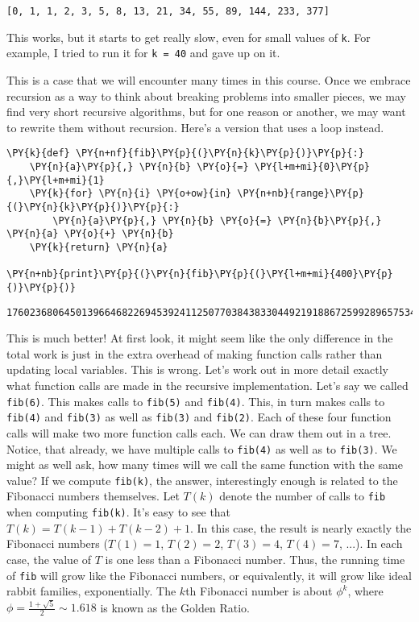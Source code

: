 \begin{Verbatim}
[0, 1, 1, 2, 3, 5, 8, 13, 21, 34, 55, 89, 144, 233, 377]

\end{Verbatim}


This works, but it starts to get really slow, even for small values of \texttt{k}.
For example, I tried to run it for \texttt{k = 40} and gave up on it.


This is a case that we will encounter many times in this course.
Once we embrace recursion as a way to think about breaking problems into smaller pieces, we may find very short recursive algorithms, but for one reason or another, we may want to rewrite them without recursion.
Here's a version that uses a loop instead.


\begin{Verbatim}[commandchars=\\\{\}]
\PY{k}{def} \PY{n+nf}{fib}\PY{p}{(}\PY{n}{k}\PY{p}{)}\PY{p}{:}
    \PY{n}{a}\PY{p}{,} \PY{n}{b} \PY{o}{=} \PY{l+m+mi}{0}\PY{p}{,}\PY{l+m+mi}{1}
    \PY{k}{for} \PY{n}{i} \PY{o+ow}{in} \PY{n+nb}{range}\PY{p}{(}\PY{n}{k}\PY{p}{)}\PY{p}{:}
        \PY{n}{a}\PY{p}{,} \PY{n}{b} \PY{o}{=} \PY{n}{b}\PY{p}{,} \PY{n}{a} \PY{o}{+} \PY{n}{b}
    \PY{k}{return} \PY{n}{a}

\PY{n+nb}{print}\PY{p}{(}\PY{n}{fib}\PY{p}{(}\PY{l+m+mi}{400}\PY{p}{)}\PY{p}{)}
\end{Verbatim}

\begin{Verbatim}
176023680645013966468226945392411250770384383304492191886725992896575345044216019675

\end{Verbatim}


This is much better!
At first look, it might seem like the only difference in the total work is just in the extra overhead of making function calls rather than updating local variables.
This is wrong.
Let's work out in more detail exactly what function calls are made in the recursive implementation.
Let's say we called \texttt{fib(6)}.
This makes calls to \texttt{fib(5)} and \texttt{fib(4)}.
This, in turn makes calls to \texttt{fib(4)} and \texttt{fib(3)} as well as \texttt{fib(3)} and \texttt{fib(2)}.
Each of these four function calls will make two more function calls each.
We can draw them out in a tree.
Notice, that already, we have multiple calls to \texttt{fib(4)} as well as to \texttt{fib(3)}.
We might as well ask, how many times will we call the same function with the same value?
If we compute \texttt{fib(k)}, the answer, interestingly enough is related to the Fibonacci numbers themselves.
Let $T(k)$ denote the number of calls to \texttt{fib} when computing \texttt{fib(k)}.
It's easy to see that $T(k) = T(k-1) + T(k-2) + 1$.
In this case, the result is nearly exactly the Fibonacci numbers ($T(1) = 1$, $T(2) = 2$, $T(3) = 4$, $T(4) = 7$, ...).  In each case, the value of $T$ is one less than a Fibonacci number.  Thus, the running time of \texttt{fib} will grow like the Fibonacci numbers, or equivalently, it will grow like ideal rabbit families, exponentially.  The $k$th Fibonacci number is about $\phi^k$, where $\phi = \frac{1+\sqrt{5}}{2}\sim1.618$ is known as the Golden Ratio.

